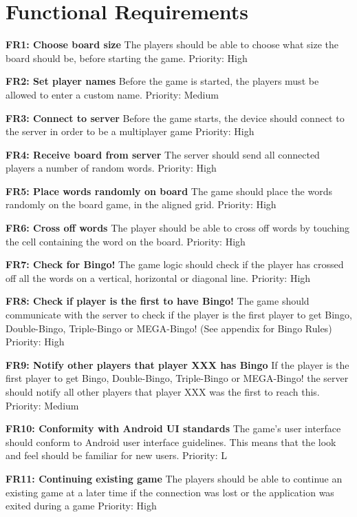 \section{Functional Requirements} 
\label{sec:functional requirements}

{\bf FR1: Choose board size}
The players should be able to choose what size the board should be, before starting the game.
Priority: High

{\bf FR2: Set player names}
Before the game is started, the players must be allowed to enter a custom name.
Priority: Medium

{\bf FR3: Connect to server}
Before the game starts, the device should connect to the server in order to be a multiplayer game
Priority: High

{\bf FR4: Receive board from server}
The server should send all connected players a number of random words.
Priority: High

{\bf FR5: Place words randomly on board}
The game should place the words randomly on the board game, in the aligned grid. 
Priority: High

{\bf FR6: Cross off words}
The player should be able to cross off words by touching the cell containing the word on the board.
Priority: High

{\bf FR7: Check for Bingo!}
The game logic should check if the player has crossed off all the words on a vertical, horizontal or diagonal line.
Priority: High

{\bf FR8: Check if player is the first to have Bingo!}
The game should communicate with the server to check if the player is the first player to get Bingo, Double-Bingo, Triple-Bingo or MEGA-Bingo! (See appendix for Bingo Rules)
Priority: High

{\bf FR9: Notify other players that player XXX has Bingo}
If the player is the first player to get Bingo, Double-Bingo, Triple-Bingo or MEGA-Bingo! the server should notify all other players that player XXX was the first to reach this.
Priority: Medium

{\bf FR10: Conformity with Android UI standards}
The game's user interface should conform to Android user interface guidelines. This means that the look and feel should be familiar for new users.
Priority: L

{\bf FR11: Continuing existing game}
The players should be able to continue an existing game at a later time if the connection was lost or the application was exited during a game
Priority: High